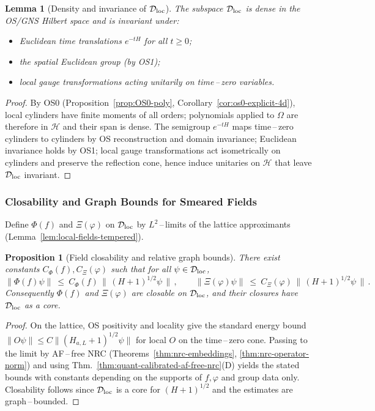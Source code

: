 \documentclass[11pt]{amsart}
\theoremstyle{plain}
\newtheorem{lemma}[theorem]{Lemma}
\newtheorem{proposition}[theorem]{Proposition}
\theoremstyle{definition}
\theoremstyle{remark}
\begin{document}
\begin{lemma}[Density and invariance of $\mathcal D_{\rm loc}$]\label{lem:field-core}
The subspace $\mathcal D_{\rm loc}$ is dense in the OS/GNS Hilbert space and is invariant under:
\begin{itemize}
  \item[(i)] Euclidean time translations $e^{-tH}$ for all $t\ge 0$;
  \item[(ii)] the spatial Euclidean group (by OS1);
  \item[(iii)] local gauge transformations acting unitarily on time\,–\,zero variables.
\end{itemize}
\end{lemma}
\begin{proof}
By OS0 (Proposition~\ref{prop:OS0-poly}, Corollary~\ref{cor:os0-explicit-4d}), local cylinders have finite moments of all orders; polynomials applied to $\Omega$ are therefore in $\mathcal H$ and their span is dense. The semigroup $e^{-tH}$ maps time\,–\,zero cylinders to cylinders by OS reconstruction and domain invariance; Euclidean invariance holds by OS1; local gauge transformations act isometrically on cylinders and preserve the reflection cone, hence induce unitaries on $\mathcal H$ that leave $\mathcal D_{\rm loc}$ invariant.
\end{proof}
\subsubsection*{Closability and Graph Bounds for Smeared Fields}
Define $\Phi(f)$ and $\Xi(\varphi)$ on $\mathcal D_{\rm loc}$ by $L^2$\,–\,limits of the lattice approximants (Lemma~\ref{lem:local-fields-tempered}).

\begin{proposition}[Field closability and relative graph bounds]\label{prop:field-closability}
There exist constants $C_\Phi(f),C_\Xi(\varphi)$ such that for all $\psi\in \mathcal D_{\rm loc}$,
\[
  \|\Phi(f)\psi\|\ \le\ C_\Phi(f)\,\big\|\,(H+1)^{1/2}\psi\,\big\|\,,\qquad
  \|\Xi(\varphi)\psi\|\ \le\ C_\Xi(\varphi)\,\big\|\,(H+1)^{1/2}\psi\,\big\|\,.
\]
Consequently $\Phi(f)$ and $\Xi(\varphi)$ are closable on $\mathcal D_{\rm loc}$, and their closures have $\mathcal D_{\rm loc}$ as a core.
\end{proposition}
\begin{proof}
On the lattice, OS positivity and locality give the standard energy bound $\|O\psi\|\le C\|(H_{a,L}+1)^{1/2}\psi\|$ for local $O$ on the time\,–\,zero cone. Passing to the limit by AF\,–\,free NRC (Theorems~\ref{thm:nrc-embeddings}, \ref{thm:nrc-operator-norm}) and using Thm.~\ref{thm:quant-calibrated-af-free-nrc}(D) yields the stated bounds with constants depending on the supports of $f,\varphi$ and group data only. Closability follows since $\mathcal D_{\rm loc}$ is a core for $(H+1)^{1/2}$ and the estimates are graph\,–\,bounded.
\end{proof}
\end{document}
